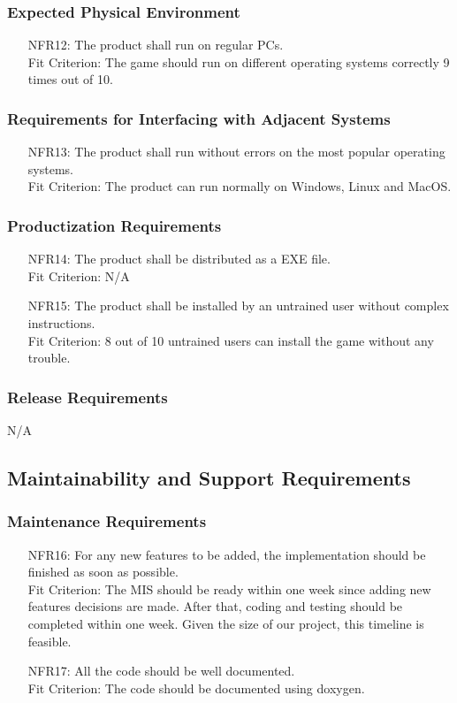 \documentclass[12pt]{article}
\begin{document}
\subsubsection{Expected Physical Environment}
\begin{itemize}
\item[NFR12:] The product shall run on regular PCs.\\ Fit Criterion: The game should run on different operating systems
correctly 9 times out of 10.
\end{itemize}
\subsubsection{Requirements for Interfacing with Adjacent Systems}
\begin{itemize}
\item[NFR13:] The product shall run without errors on the most popular operating systems.\\
Fit Criterion: The product can run normally on Windows, Linux and MacOS.
\end{itemize}
\subsubsection{Productization Requirements}
\begin{itemize}
\item[NFR14:] The product shall be distributed as a EXE file. \\ Fit Criterion: N/A
\item[NFR15:] The product shall be installed by an untrained user without complex instructions.\\
Fit Criterion: 8 out of 10 untrained users can install the game without any trouble.
\end{itemize}
\subsubsection{Release Requirements}
N/A
\subsection{Maintainability and Support Requirements}
\subsubsection{Maintenance Requirements}
\begin{itemize}
\item [NFR16:]For any new features to be added, the implementation should be finished as soon as possible.\\ Fit Criterion: The MIS should be ready within one week since 
adding new features decisions are made. After that, coding
and testing should be completed within one week. Given the size
of our project, this timeline is feasible.
\item[NFR17:] All the code should be well documented. \\ Fit Criterion: The code should be documented using doxygen.
\end{itemize}
\end{document}
